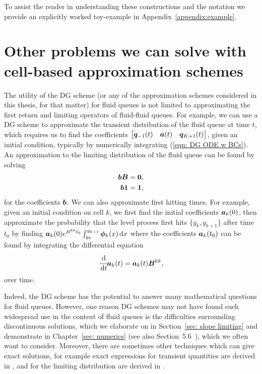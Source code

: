 To assist the reader in understanding these constructions and the notation we provide an explicitly worked toy-example in Appendix~\ref{appendix:example}.


\section{Other problems we can solve with cell-based approximation schemes}\label{sec: other applications}
The utility of the DG scheme (or any of the approximation schemes considered in this thesis, for that matter) for fluid queues is not limited to approximating the first return and limiting operators of fluid-fluid queues. For example, we can use a DG scheme to approximate the transient distribution of the fluid queue at time \(t\), which requires us to find the coefficients \(\begin{bmatrix} \boldsymbol q_{-1}(t) & \boldsymbol a(t) & \boldsymbol q_{{K+1}}(t) \end{bmatrix}\), given an initial condition, typically by numerically integrating (\ref{eqn: DG ODE w BCs}). An approximation to the limiting distribution of the fluid queue can be found by solving 
\begin{align*}
	\boldsymbol b \boldsymbol B &= \boldsymbol 0,
	\\ \boldsymbol b \boldsymbol 1 &= \boldsymbol 1,
\end{align*}
for the coefficients \(\boldsymbol b\). We can also approximate first hitting times. For example, given an initial condition on cell \(k\), we first find the initial coefficients \(\boldsymbol a_k(0)\), then approximate the probability that the level process first hits \(\{y_k,y_{k+1}\}\) after time \(t_0\) by finding \(\boldsymbol a_k(0)e^{B^{kk} t_0}\int_{y_k}^{y_{k+1}}\boldsymbol \phi_k(x)\, \mathrm{d} x\) where the coefficients \(\boldsymbol a_k(t_0)\) can be found by integrating the differential equation 
\[\cfrac{\, \mathrm{d}}{\, \mathrm{d} t}\boldsymbol a_k(t)=\boldsymbol a_k(t)\boldsymbol B^{kk},\]
over time. 

Indeed, the DG scheme has the potential to answer many mathematical questions for fluid queues. However, one reason DG schemes may not have found such widespread use in the context of fluid queues is the difficulties surrounding discontinuous solutions, which we elaborate on in Section~\ref{sec: slope limiting} and demonstrate in Chapter~\ref{sec: numerics} (see also Section~5.6~\cite{nodalDGBook}), which we often want to consider. Moreover, there are sometimes other techniques which can give exact solutions, for example exact expressions for transient quantities are derived in \cite{rs2003,ar2004,bean2005,bean2009}, and for the limiting distribution are derived in \cite{ajr2005,dasilva2005,lnp13,s2017}. 

